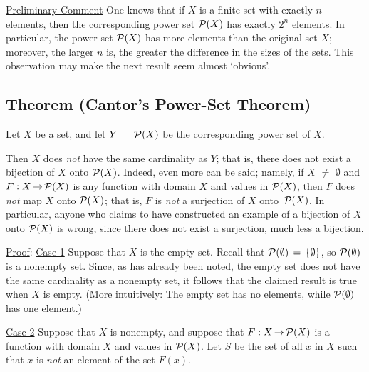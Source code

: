 \V
\V


        \underline{Preliminary Comment} One knows that if $X$ is a finite set with exactly $n$ elements,
    then the corresponding power set ${\cal P}(X)$ has exactly $2^{n}$ elements. In particular, the power set ${\cal P}(X)$ has more elements than the original set $X$;
    moreover, the larger $n$ is, the greater the difference in the sizes of the sets.
    This observation may make the next result seem almost `obvious'.

\V

            \subsection{\small{\bf Theorem} (Cantor's Power-Set Theorem)} 

        Let $X$ be a set, and let $Y \,=\, {\cal P}(X)$ be the corresponding power set of $X$.

    Then $X$ does {\em not} have the same cardinality as $Y$; that is, there does not exist a bijection of $X$ onto ${\cal P}(X)$.
    Indeed, even more can be said; namely, if $X \,\,{\neq}\,\, {\emptyset}$ and $F:X \,{\rightarrow}\, {\cal P}(X)$ is any function with domain $X$ and values in ${\cal P}(X)$,
    then $F$ does {\em not} map $X$ onto ${\cal P}(X)$; that is, $F$ is {\em not} a surjection of $X$ onto~${\cal P}(X)$.
    In particular, anyone who claims to have constructed an example of a bijection of $X$ onto ${\cal P}(X)$ is wrong,
    since there does not exist a surjection, much less a bijection.

\V


        \underline{Proof}: \underline{Case 1} Suppose that $X$ is the empty set.
    Recall that ${\cal P}({\emptyset}) \,=\, \{{\emptyset}\}$, so ${\cal P}({\emptyset})$ is a nonempty set.
    Since, as has already been noted, the empty set does not have the same cardinality as a nonempty set,
    it follows that the claimed result is true when $X$ is empty. (More intuitively: The empty set has no elements, while ${\cal P}({\emptyset})$ has one element.)

\V

        \underline{Case 2} Suppose that $X$ is nonempty, and suppose that $F:X \,{\rightarrow}\, {\cal P}(X)$ is a function with domain $X$ and values in ${\cal P}(X)$.
    Let $S$ be the set of all $x$ in $X$ such that $x$ is {\em not} an element of the set $F(x)$.

